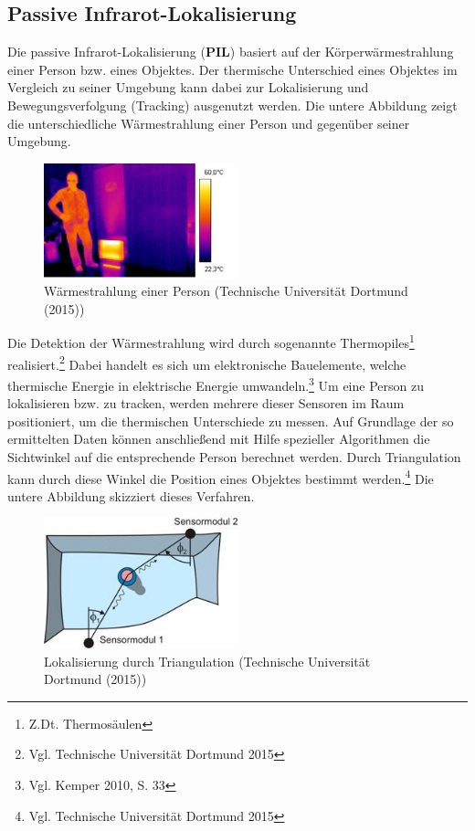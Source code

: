 \subsection{Passive Infrarot-Lokalisierung}
Die passive Infrarot-Lokalisierung (\textbf{PIL}) basiert auf der Körperwärmestrahlung einer Person bzw. eines Objektes. Der thermische Unterschied eines Objektes im Vergleich zu seiner Umgebung kann dabei zur Lokalisierung und Bewegungsverfolgung (Tracking) ausgenutzt werden. Die untere Abbildung zeigt die unterschiedliche Wärmestrahlung einer Person und gegenüber seiner Umgebung.

\begin{figure}[H]
	\centering
	\includegraphics[width=0.5\textwidth]{pictures/pil1}
	\caption{Wärmestrahlung einer Person (Technische Universität Dortmund (2015))}
\end{figure}

Die Detektion der Wärmestrahlung wird durch sogenannte Thermopiles\footnote{Z.Dt. Thermosäulen}  realisiert.\footnote{Vgl. Technische Universität Dortmund 2015} Dabei handelt es sich um elektronische Bauelemente, welche thermische Energie in elektrische Energie umwandeln.\footnote{Vgl. Kemper 2010, S. 33} Um eine Person zu lokalisieren bzw. zu tracken, werden mehrere dieser Sensoren im Raum positioniert, um die thermischen Unterschiede zu messen. Auf Grundlage der so ermittelten Daten können anschließend mit Hilfe spezieller Algorithmen die Sichtwinkel auf die entsprechende Person berechnet werden. Durch Triangulation kann durch diese Winkel die Position eines Objektes bestimmt werden.\footnote{Vgl. Technische Universität Dortmund 2015} Die untere Abbildung skizziert dieses Verfahren.

\begin{figure}[H]
	\centering
	\includegraphics[width=0.5\textwidth]{pictures/triangulation}
	\caption{Lokalisierung durch Triangulation (Technische Universität Dortmund (2015))}
\end{figure}

